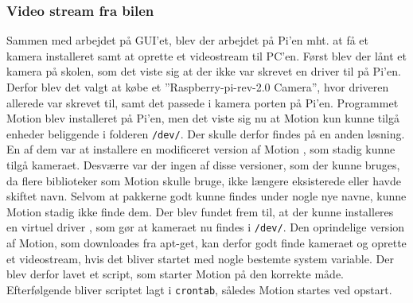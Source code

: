 \subsubsection{Video stream fra bilen}

Sammen med arbejdet på GUI’et, blev der arbejdet på Pi’en mht. at få et kamera installeret samt at oprette et videostream til PC'en. 
Først blev der lånt et kamera på skolen, som det viste sig at der ikke var skrevet en driver til på Pi'en. 
Derfor blev det valgt at købe et ''Raspberry-pi-rev-2.0 Camera'', hvor driveren allerede var skrevet til, samt det passede i kamera porten på Pi’en. 
Programmet Motion blev installeret på Pi’en, men det viste sig nu at Motion kun kunne tilgå enheder beliggende i folderen \texttt{\//dev/}. 
Der skulle derfor findes på en anden løsning. 
En af dem var at installere en modificeret version af Motion \cite{lib:motion-on-raspberry}, som stadig kunne tilgå kameraet. 
Desværre var der ingen af disse versioner, som der kunne bruges, da flere biblioteker som Motion skulle bruge, ikke længere eksisterede eller havde skiftet navn. 
Selvom at pakkerne godt kunne findes under nogle nye navne, kunne Motion stadig ikke finde dem. 
Der blev fundet frem til, at der kunne installeres en virtuel driver \cite{lib:camera-driver}, som gør at kameraet nu findes i \texttt{\//dev/}. 
Den oprindelige version af Motion, som downloades fra apt-get, kan derfor godt finde kameraet og oprette et videostream, hvis det bliver startet med nogle bestemte system variable. 
Der blev derfor lavet et script, som starter Motion på den korrekte måde. 
Efterfølgende bliver scriptet lagt i \texttt{crontab}, således Motion startes ved opstart. 